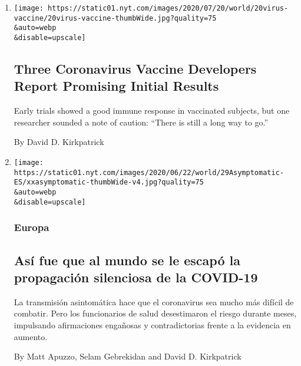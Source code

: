 \begin{enumerate}
\def\labelenumi{\arabic{enumi}.}
\item
  \href{/2020/07/20/world/covid-coronavirus-vaccine.html}{}

  \texttt{[image: https://static01.nyt.com/images/2020/07/20/world/20virus-vaccine/20virus-vaccine-thumbWide.jpg?quality=75\\\&auto=webp\\\&disable=upscale]}

  \hypertarget{three-coronavirus-vaccine-developers-report-promising-initial-results}{%
  \subsection{Three Coronavirus Vaccine Developers Report Promising
  Initial
  Results}\label{three-coronavirus-vaccine-developers-report-promising-initial-results}}

  Early trials showed a good immune response in vaccinated subjects, but
  one researcher sounded a note of caution: ``There is still a long way
  to go.''

  By David D. Kirkpatrick
\item
  \href{/es/2020/06/29/espanol/mundo/coronavirus-asintomaticos.html}{}

  \texttt{[image: https://static01.nyt.com/images/2020/06/22/world/29Asymptomatic-ES/xxasymptomatic-thumbWide-v4.jpg?quality=75\\\&auto=webp\\\&disable=upscale]}

  \hypertarget{europa}{%
  \subsubsection{Europa}\label{europa}}

  \hypertarget{asuxed-fue-que-al-mundo-se-le-escapuxf3-la-propagaciuxf3n-silenciosa-de-la-covid-19}{%
  \subsection{Así fue que al mundo se le escapó la propagación
  silenciosa de la
  COVID-19}\label{asuxed-fue-que-al-mundo-se-le-escapuxf3-la-propagaciuxf3n-silenciosa-de-la-covid-19}}

  La transmisión asintomática hace que el coronavirus sea mucho más
  difícil de combatir. Pero los funcionarios de salud desestimaron el
  riesgo durante meses, impulsando afirmaciones engañosas y
  contradictorias frente a la evidencia en aumento.

  By Matt Apuzzo, Selam Gebrekidan and David D. Kirkpatrick


\end{enumerate}

